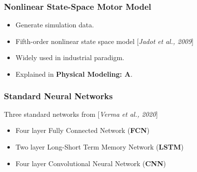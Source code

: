 \documentclass{beamer}
\newcommand{\etal}{\textit{et al.}}
\begin{document}
\begin{frame}
\frametitle{Nonlinear State-Space Motor Model}

\begin{itemize}
    \item Generate simulation data.
    \item Fifth-order nonlinear state space model [\textit{Jadot \etal, 2009}]
    \item Widely used in industrial paradigm.
    \item Explained in \textbf{Physical Modeling: A}.
\end{itemize}

\end{frame}




\begin{frame}
\frametitle{Standard Neural Networks}

Three standard networks from [\textit{Verma \etal, 2020}]

\begin{itemize}
    \item Four layer Fully Connected Network (\textbf{FCN})
    \item Two layer Long-Short Term Memory Network (\textbf{LSTM})
    \item Four layer Convolutional Neural Network (\textbf{CNN})
\end{itemize}


\end{frame}
\end{document}
